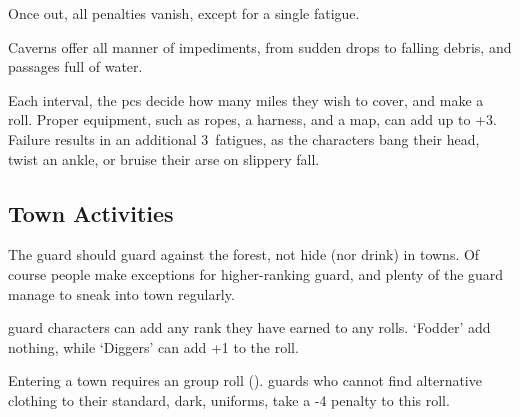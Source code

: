 \begin{multicols}{2}
Once out, all penalties vanish, except for a single \gls{fatigue}.

Caverns offer all manner of impediments, from sudden drops to falling debris, and passages full of water.

\caveTravelChart

Each \gls{interval}, the \glspl{pc} decide how many miles they wish to cover, and make a roll.
Proper equipment, such as ropes, a harness, and a map, can add up to +3.
Failure results in an additional 3~\glspl{fatigue}, as the characters bang their head, twist an ankle, or bruise their arse on slippery fall.

\subsection{Town Activities}

The \gls{guard} should guard against the forest, not hide (nor drink) in towns.
Of course people make exceptions for higher-ranking \gls{guard}, and plenty of the guard manage to sneak into town regularly.


\Gls{guard} characters can add any rank they have earned to any rolls.
`Fodder' add nothing, while `Diggers' can add +1 to the roll.

Entering a town requires an  group roll (\tn[7]).
\Glspl{guard} who cannot find alternative clothing to their standard, dark, uniforms, take a -4 penalty to this roll.


\end{multicols}

